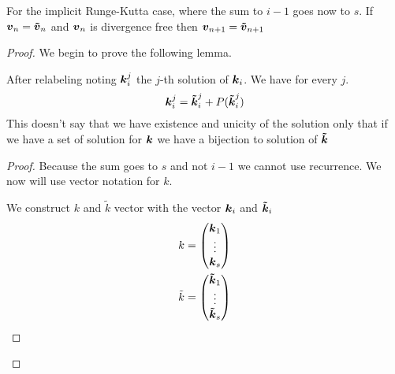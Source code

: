 \begin{theorem}
For the implicit Runge-Kutta case, where the sum to $i-1$ goes now to $s$.
If ${\boldsymbol {v}}_{n}={\boldsymbol {\tilde{v}}}_{n}$ and ${\boldsymbol {v}}_n$ is divergence free then ${\boldsymbol {v}}_{n+1}={\boldsymbol {\tilde{v}}}_{n+1}$ 
\end{theorem}
\begin{proof}
We begin to prove the following lemma.
\begin{lemma}
After relabeling noting ${\boldsymbol {k}}_{i}^{j}$ the $j$-th solution of ${\boldsymbol {k}}_{i}$.
We have for every $j$.
\begin{equation}
  {\boldsymbol {k}}_{i}^{j}={\boldsymbol {\tilde{k}}}_{i}^{j}+P({\boldsymbol {\tilde{k}}}_{i}^{j})
\end{equation}
This doesn't say that we have existence and unicity of the solution only that if we have a set of solution for ${\boldsymbol {k}}$ we have a bijection
to solution of ${\boldsymbol {\tilde{k}}}$
\end{lemma}
\begin{proof}
Because the sum goes to $s$ and not $i-1$ we cannot use recurrence.
We now will use vector notation for $k$.

We construct $k$ and $\tilde{k}$ vector with the vector ${\boldsymbol {k}}_{i}$ and ${\boldsymbol {\tilde{k}}}_{i}$
\begin{align}
k&=\begin{pmatrix}
    {\boldsymbol {k}}_{1}\\
    \vdots\\
    {\boldsymbol {k}}_{s}\\
  \end{pmatrix}\\
\tilde{k}&=\begin{pmatrix}
    {\boldsymbol {\tilde{k}}}_{1}\\
    \vdots\\
    {\boldsymbol {\tilde{k}}}_{s}\\
  \end{pmatrix}
\end{align}


\end{proof}
\end{proof}
